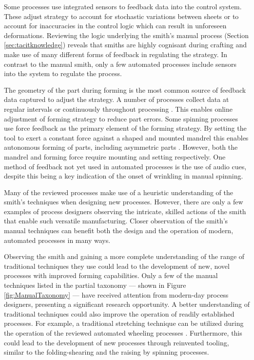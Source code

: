 Some processes use integrated sensors to feedback data into the control system. These adjust strategy to account for stochastic variations between sheets or to account for inaccuracies in the control logic which can result in unforeseen deformations. Reviewing the logic underlying the smith’s manual process (Section \ref{sec:tacitknowledge}) reveals that smiths are highly cognisant during crafting and make use of many different forms of feedback in regulating the strategy. In contrast to the manual smith, only a few automated processes include sensors into the system to regulate the process. 

The geometry of the part during forming is the most common source of feedback data captured to adjust the strategy. A number of processes collect data at regular intervals or continuously throughout processing \citep{Mori1998IncrementalDatabase,Ilangovan2016AnForming,Tanaka2008FormingMeasurement,Tanaka2014DevelopmentHammering}. This enables online adjustment of forming strategy to reduce part errors. Some spinning processes use force feedback as the primary element of the forming strategy. By setting the tool to exert a constant force against a shaped and mounted mandrel this enables autonomous forming of parts, including asymmetric parts \citep{Arai2006Force-controlledMotors}. However, both the mandrel and forming force require mounting and setting respectively. One method of feedback not yet used in automated processes is the use of audio cues, despite this being a key indication of the onset of wrinkling in manual spinning.


Many of the reviewed processes make use of a heuristic understanding of the smith’s techniques when designing new processes. However, there are only a few examples of process designers observing the intricate, skilled actions of the smith that enable such versatile manufacturing. Closer observation of the smith’s manual techniques can benefit both the design and the operation of modern, automated processes in many ways.

Observing the smith and gaining a more complete understanding of the range of traditional techniques they use could lead to the development of new, novel processes with improved forming capabilities. Only a few of the manual techniques listed in the partial taxonomy --- shown in Figure \ref{fig:ManualTaxonomy} --- have received attention from modern-day process designers, presenting a significant research opportunity. A better understanding of traditional techniques could also improve the operation of readily established processes. For example, a traditional stretching technique can be utilized during the operation of the reviewed automated wheeling processes \citep{Vazquez2017RoboticWheeling,Rossi2018ModellingWheel}. 
Furthermore, this could lead to the development of new processes through reinvented tooling, similar to the folding-shearing \citep{Allwood2019Folding-shearing:Change} and the raising by spinning \citep{Russo2020RaisingSpinning} processes.

